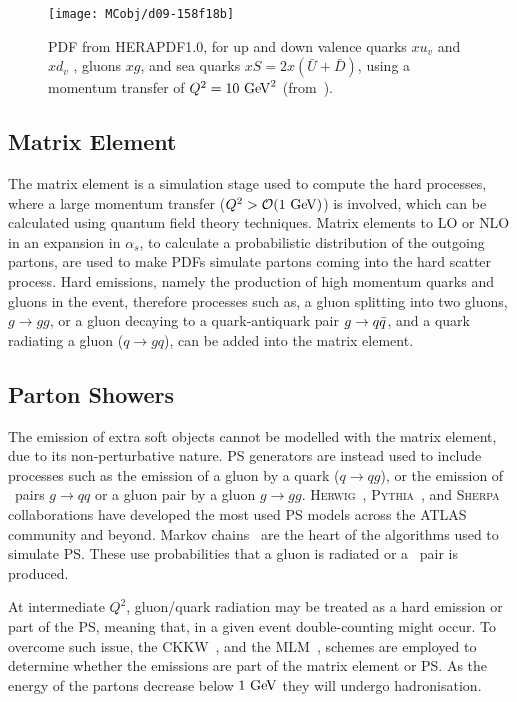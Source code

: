 			\begin{figure}[!htb]
				\centering
				\texttt{[image: MCobj/d09-158f18b]}
				\caption{\label{fig:HERAPDF} PDF from \textsc{HERAPDF1.0}, for up and down valence quarks $xu_v$ and $xd_v$ , gluons $xg$, and sea quarks $xS = 2x(\bar{U} + \bar{D})$, using a momentum transfer of $Q^2 =10 \GeV^2$ (from~\cite{Aaron:2009aa}).}
			\end{figure}

		\subsection*{Matrix Element}

			The matrix element is a simulation stage used to compute the hard processes, where a large momentum transfer ($Q^2 > \mathcal{O}(1 \GeV)$) is involved, which can be calculated using quantum field theory techniques. Matrix elements to \ac{LO} or \ac{NLO} in an expansion in $\alpha_s$, to calculate a probabilistic distribution of the outgoing partons, are used to make \acp{PDF} simulate partons coming into the hard scatter process. Hard emissions, namely the production of high momentum quarks and gluons in the event, therefore processes such as, a gluon splitting into two gluons, $g \to gg$, or a gluon decaying to a quark-antiquark pair $g \rightarrow q\bar{q}$, and a quark radiating a gluon ($q \to gq$), can be added into the matrix element.

		\subsection*{Parton Showers}

			The emission of extra soft objects cannot be modelled with the matrix element, due to its non-perturbative nature. \ac{PS} generators are instead used to include processes such as the emission of a gluon by a quark ($q \to qg$), or the emission of \qqbar\ pairs $g \to qq$ or a gluon pair by a gluon $g \to gg$. \textsc{Herwig}~\cite{Herwig2001}, \textsc{Pythia}~\cite{Pythia2006}, and \textsc{Sherpa}~\cite{Sherpa} collaborations have developed the most used \ac{PS} models across the \ac{ATLAS} community and beyond. Markov chains~\cite{Berg2004} are the heart of the algorithms used to simulate \ac{PS}. These use probabilities that a gluon is radiated or a \qqbar\ pair is produced. %

			At intermediate $Q^2$, gluon/quark radiation may be treated as a hard emission or part of the \ac{PS}, meaning that, in a given event double-counting might occur. To overcome such issue, the \ac{CKKW}~\cite{QCD2001}, and the \ac{MLM}~\cite{ME2001}, schemes are employed to determine whether the emissions are part of the matrix element or \ac{PS}. As the energy of the partons decrease below $1 \GeV$ they will undergo hadronisation.

